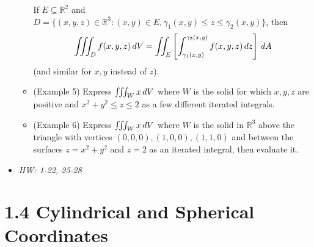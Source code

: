 \documentclass[11pt]{article}
\begin{document}
\begin{itemize}
\begin{itemize}
      If \(E\subseteq\mathbb R^2\) and
      \(D=\{(x,y,z)\in\mathbb R^3:(x,y)\in E,\gamma_1(x,y)\leq z\leq\gamma_2(x,y)\}\),
      then
      \[
        \iiint_D f(x,y,z)\,d V
          =
        \iint_E
          \left[\int_{\gamma_1(x,y)}^{\gamma_2(x,y)} f(x,y,z)\,d z\right]
        \,d A
      \]
      (and similar for \(x,y\) instead of \(z\)).
      \item (Example 5) Express \(\iiint_W x\,d V\) where \(W\) is the
      solid for which \(x,y,z\) are positive and \(x^2+y^2\leq z\leq 2\)
      as a few different iterated integrals.
      \item (Example 6) Express \(\iiint_W x\,d V\) where \(W\) is the
      solid in \(\mathbb R^3\) above the triangle with vertices
      \((0,0,0),(1,0,0),(1,1,0)\) and between the surfaces \(z=x^2+y^2\)
      and \(z=2\) as an iterated integral, then evaluate it.
    \end{itemize}
  \item\textit{
    HW: 1-22, 25-28
  }
\end{itemize}



\section*{1.4 Cylindrical and Spherical Coordinates}
\end{document}
